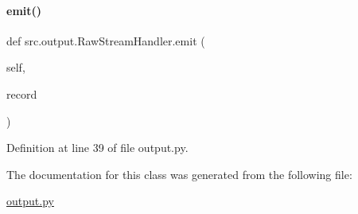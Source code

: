 \paragraph{\texorpdfstring{emit()}{emit()}}
{\footnotesize\ttfamily def src.\+output.\+Raw\+Stream\+Handler.\+emit (\begin{DoxyParamCaption}\item[{}]{self,  }\item[{}]{record }\end{DoxyParamCaption})}



Definition at line 39 of file output.\+py.



The documentation for this class was generated from the following file\+:\begin{DoxyCompactItemize}
\item 
\hyperlink{output_8py}{output.\+py}\end{DoxyCompactItemize}
